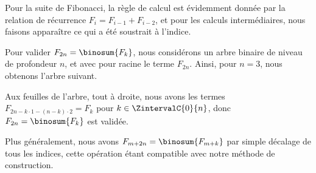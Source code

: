 Pour la suite de Fibonacci, la règle de calcul est évidemment donnée par la relation de récurrence $F_{i} = F_{i-1} + F_{i-2}$, et pour les calculs intermédiaires, nous faisons apparaître ce qui a été soustrait à l'indice.

%
            {\intertree}{}

Pour valider $F_{2n} = \binosum{F_k}$, nous considérons un arbre binaire de niveau de profondeur $n$, et avec pour racine le terme $F_{2n}$.
Ainsi, pour $n=3$, nous obtenons l'arbre suivant.


Aux feuilles de l'arbre, tout à droite, nous avons les termes 
$F_{2n - k\cdot1 - (n-k)\cdot2} = F_k$
pour $k \in \ZintervalC{0}{n}$,
donc
$F_{2n} = \binosum{F_k}$ est validée.

\begin{remark}
	Plus généralement, nous avons
	$F_{m+2n}= \binosum{F_{m+k}}$
	par simple décalage de tous les indices, cette opération étant compatible avec notre méthode de construction.
\end{remark}
